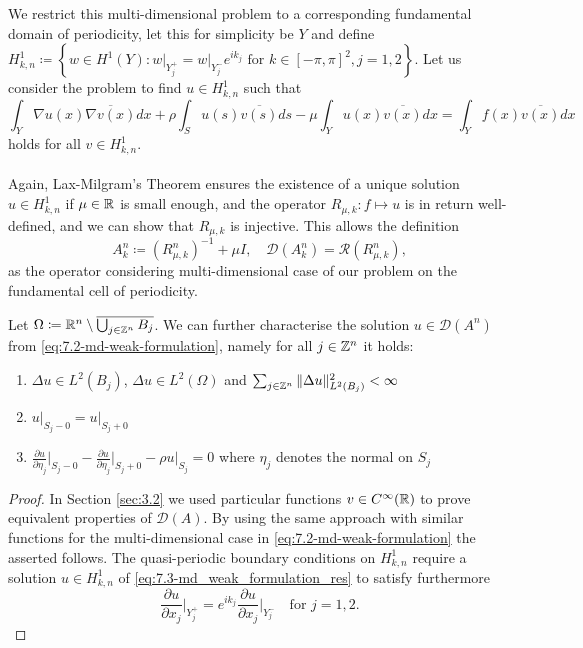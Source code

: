 We restrict this multi-dimensional problem to a corresponding fundamental domain of periodicity, let this for simplicity be $Y$ and define $H^{1}_{k, n} \coloneqq \left\{ w \in H^{1}(Y) \colon w \big|_{Y_{j}^{+}} = w \big|_{Y_{j}^{-}} e^{i k_{j}} \text{ for } k \in [-\pi, \pi]^{2}, j = 1,2 \right\}$. Let us consider the problem to find $u \in H^{1}_{k, n}$ such that
	\begin{equation}
		\int_{Y} \nabla u(x) \overline{\nabla v(x)} dx + \rho \int_{S} u(s) \overline{v(s)} ds - \mu \int_{Y} u(x) \overline{v(x)} dx = \int_{Y} f(x) \overline{v(x)} dx \label{eq:7.3-md_weak_formulation_res}
	\end{equation} 
holds for all $v \in H^{1}_{k, n}$. 
~\\ ~\\
Again, Lax-Milgram's Theorem ensures the existence of a unique solution $u \in H^{1}_{k, n}$ if $\mu \in \mathbb{R}$ is small enough, and the operator $R_{\mu, k} \colon f \mapsto u$ is in return well-defined, and we can show that $R_{\mu, k}$ is injective. This allows the definition 
	\[ A_{k}^{n} \coloneqq \left(R_{\mu, k}^{n}\right)^{-1} + \mu I, \quad \mathcal{D}(A_{k}^{n}) = \mathcal{R}(R_{\mu, k}^{n}), \]
as the operator considering multi-dimensional case of our problem on the fundamental cell of periodicity.

\begin{theorem} Let $\Omega \coloneqq \mathbb{R}^{n} \setminus \overline{\bigcup_{j \in \mathbb{Z}^{n}} B_{j}}$. We can further characterise the solution $u \in \mathcal{D}(A^{n})$ from \eqref{eq:7.2-md-weak-formulation}, namely for all $j \in \mathbb{Z}^{n}$ it holds:
	\begin{enumerate} %
		\item $\Delta u \in L^{2}(B_{j})$, $\Delta u \in L^{2}(\Omega)$ and $\sum_{j \in \mathbb{Z}^{n}} \|\Delta u \|_{L^{2}(B_{j})}^{2} < \infty$
		\item $u \big|_{S_{j} - 0} = u \big|_{S_{j} + 0}$
		\item $\frac{\partial u}{\partial \eta_{j}} \big|_{S_{j} - 0} - \frac{\partial u}{\partial \eta_{j}} \big|_{S_{j} + 0} - \rho u \big|_{S_{j}} = 0$ where $\eta_{j}$ denotes the normal on $S_{j}$
	\end{enumerate}
\end{theorem}
	
\begin{proof} %
 	In Section \ref{sec:3.2} we used particular functions $v \in C^{\infty}(\mathbb{R})$ to prove equivalent properties of $\mathcal{D}(A)$. By using the same approach with similar functions for the multi-dimensional case in \eqref{eq:7.2-md-weak-formulation} the asserted follows. 
	The quasi-periodic boundary conditions on $H^{1}_{k,n}$ require a solution $u \in H^{1}_{k, n}$ of \eqref{eq:7.3-md_weak_formulation_res} to satisfy furthermore
	\[ \frac{\partial u}{\partial x_{j}}\big|_{Y_{j}^{+}} = e^{ik_{j}} \frac{\partial u}{\partial x_{j}}\big|_{Y_{j}^{-}} \quad \text{for } j = 1, 2.  \]	
\end{proof}

